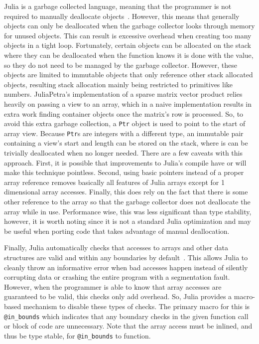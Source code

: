 \documentclass[acmsmall]{acmart}
\newcommand{\snippet}[1]{\lstinline{#1}}
\begin{document}
	Julia is a garbage collected language, meaning that the programmer is not required to manually deallocate objects~\cite{Bezanson:2017:FreshApproach}.
	However, this means that generally objects can only be deallocated when the garbage collector looks through memory for unused objects.
	This can result is excessive overhead when creating too many objects in a tight loop.
	Fortunately, certain objects can be allocated on the stack where they can be deallocated when the function knows it is done with the value, so they do not need to be managed by the garbage collector.
	However, these objects are limited to immutable objects that only reference other stack allocated objects, resulting stack allocation mainly being restricted to primitives like numbers.
	JuliaPetra's implementation of a sparse matrix vector product relies heavily on passing a view to an array, which in a naive implementation results in extra work finding container objects once the matrix's row is processed.
	So, to avoid this extra garbage collection, a \snippet{Ptr} object is used to point to the start of array view.
	Because \snippet{Ptr}s are integers with a different type, an immutable pair containing a view's start and length can be stored on the stack, where is can be trivially deallocated when no longer needed.
	There are a few caveats with this approach.
	First, it is possible that improvements to Julia's compile have or will make this technique pointless.
	Second, using basic pointers instead of a proper array reference removes basically all features of Julia arrays except for 1 dimensional array accesses.
	Finally, this does rely on the fact that there is some other reference to the array so that the garbage collector does not deallocate the array while in use.
	Performance wise, this was less significant than type stability, however, it is worth noting since it is not a standard Julia optimization and may be useful when porting code that takes advantage of manual deallocation.
	
	Finally, Julia automatically checks that accesses to arrays and other data structures are valid and within any boundaries by default~\cite{Bezanson:2017:FreshApproach}.
	This allows Julia to cleanly throw an informative error when bad accesses happen instead of silently corrupting data or crashing the entire program with a segmentation fault.
	However, when the programmer is able to know that array accesses are guaranteed to be valid, this checks only add overhead.
	So, Julia provides a macro-based mechanism to disable these types of checks.
	The primary macro for this is \snippet{@in_bounds} which indicates that any boundary checks in the given function call or block of code are unnecessary.
	Note that the array access must be inlined, and thus be type stable, for \snippet{@in_bounds} to function.
	
\end{document}
